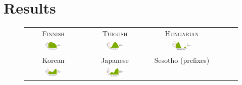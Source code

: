 \documentclass[11pt,letterpaper]{article}
\begin{document}

\section{Results}




\begin{figure}
    \centering
    \begin{tabular}{cccccc}
    \textsc{Finnish} & \textsc{Turkish} & \textsc{Hungarian} \\
        \includegraphics[width=0.3\textwidth]{figures/finnish_verbs/suffixes-byMorphemes-auc-hist-heldout-Coarse-FineSurprisal-optimized.pdf}
        &
    \includegraphics[width=0.3\textwidth]{figures/turkish_verbs/suffixes-byMorphemes-auc-hist-heldout-Coarse-FineSurprisal-optimized.pdf}
    &
    \includegraphics[width=0.3\textwidth]{figures/hungarian_verbs/suffixes-byMorphemes-auc-hist-heldout-Coarse-FineSurprisal-optimized.pdf}
    \\
    Korean & Japanese & Sesotho (prefixes) \\
    \includegraphics[width=0.3\textwidth]{figures/korean/suffixes-byMorphemes-auc-hist-heldout-Coarse-FineSurprisal-optimized.pdf}
    &
        \includegraphics[width=0.3\textwidth]{figures/japanese/suffixes-byMorphemes-auc-hist-heldout-Coarse-FineSurprisal-optimized.pdf}

\end{tabular}
\end{figure}
\end{document}
